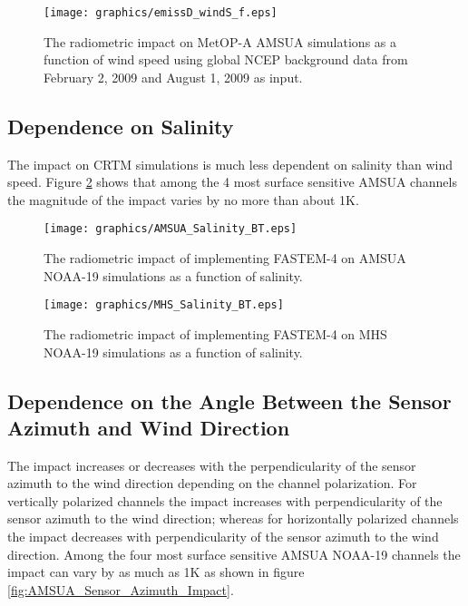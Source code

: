 \begin{figure}[htp]
  \centering
  \texttt{[image: graphics/emissD\_windS\_f.eps]}
  \caption{The radiometric impact on MetOP-A AMSUA simulations as a function of wind speed using global NCEP background data from February 2, 2009 and August 1, 2009 as input.}
  \label{fig:AMSUA_Background_Impact}
\end{figure}

\newpage

\subsection{Dependence on Salinity}
The impact on CRTM simulations is much less dependent on salinity than wind speed.  Figure \ref{fig:AMSUA_Salinity_Impact} shows that among the 4 most surface sensitive AMSUA channels the magnitude of the impact varies by no more than about 1K.



  

\begin{figure}[htp]
  \centering
  \texttt{[image: graphics/AMSUA\_Salinity\_BT.eps]}
  \caption{The radiometric impact of implementing FASTEM-4 on AMSUA NOAA-19 simulations as a function of salinity.}
  \label{fig:AMSUA_Salinity_Impact}
\end{figure}

\begin{figure}[htp]
  \centering
  \texttt{[image: graphics/MHS\_Salinity\_BT.eps]}
  \caption{The radiometric impact of implementing FASTEM-4 on MHS NOAA-19 simulations as a function of salinity.}
  \label{fig:MHS_Salinity_Impact}
\end{figure}

\newpage  

\subsection{Dependence on the Angle Between the Sensor Azimuth and Wind Direction} 
The impact increases or decreases with the perpendicularity of the sensor azimuth to the wind direction depending on the channel polarization.  For vertically polarized channels the impact increases with perpendicularity of the sensor azimuth to the wind direction; whereas for horizontally polarized channels the impact decreases with perpendicularity of the sensor azimuth to the wind direction.  Among the four most surface sensitive AMSUA NOAA-19 channels the impact can vary by as much as 1K as shown in figure \ref{fig:AMSUA_Sensor_Azimuth_Impact}.
  

